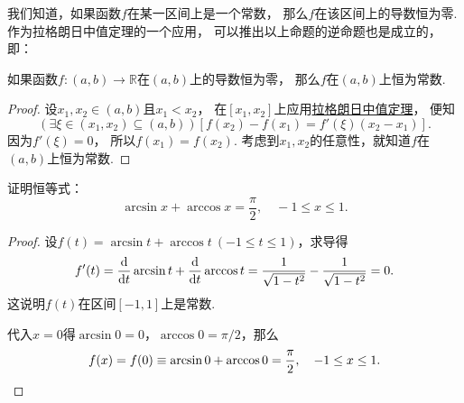 我们知道，如果函数\(f\)在某一区间上是一个常数，
那么\(f\)在该区间上的导数恒为零.作为拉格朗日中值定理的一个应用，
可以推出以上命题的逆命题也是成立的，即：
\begin{theorem}
如果函数\(f\colon(a,b)\to\mathbb{R}\)在\((a,b)\)上的导数恒为零，
那么\(f\)在\((a,b)\)上恒为常数.
\begin{proof}
设\(x_1,x_2\in(a,b)\)且\(x_1<x_2\)，
在\([x_1,x_2]\)上应用\hyperref[theorem:微分中值定理.拉格朗日中值定理]{拉格朗日中值定理}，
便知\[
	(\exists\xi\in(x_1,x_2)\subseteq(a,b))
	[f(x_2) - f(x_1) = f'(\xi) (x_2 - x_1)].
\]
因为\(f'(\xi) = 0\)，
所以\(f(x_1) = f(x_2)\).
考虑到\(x_1,x_2\)的任意性，就知道\(f\)在\((a,b)\)上恒为常数.
\end{proof}
\end{theorem}

\begin{example}
证明恒等式：\[
	\arcsin x + \arccos x = \frac{\pi}{2},
	\quad -1 \leq x \leq 1.
\]
\begin{proof}
设\(f(t) = \arcsin t + \arccos t\ (-1 \leq t \leq 1)\)，求导得\[
	f'(t) = \dv{t} \arcsin t + \dv{t} \arccos t
	= \frac{1}{\sqrt{1-t^2}} - \frac{1}{\sqrt{1-t^2}} = 0.
\]
这说明\(f(t)\)在区间\([-1,1]\)上是常数.

代入\(x=0\)得\(\arcsin 0 = 0\)，\(\arccos 0 = \pi/2\)，那么\[
	f(x) = f(0) \equiv \arcsin 0 + \arccos 0 = \frac{\pi}{2},
	\quad -1 \leq x \leq 1.
	\qedhere
\]
\end{proof}
\end{example}


